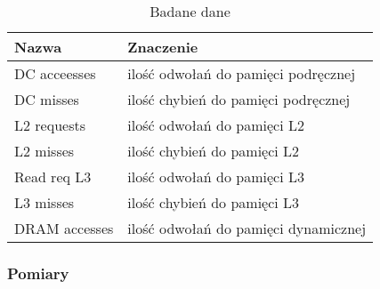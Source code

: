 \begin{table}[H]
\caption{Badane dane}
\begin{tabular}{|l|l|}

\hline
  Nazwa &
  Znaczenie \\
\hline
  DC acceesses &
  ilość odwołań do pamięci podręcznej \\
\hline
  DC misses &
  ilość chybień do pamięci podręcznej \\
\hline
  L2 requests &
  ilość odwołań do pamięci L2 \\
\hline
  L2 misses &
  ilość chybień do pamięci L2 \\
\hline
  Read req L3 &
  ilość odwołań do pamięci L3 \\
\hline
  L3 misses &
  ilość chybień do pamięci L3 \\
\hline
  DRAM accesses &
  ilość odwołań do pamięci dynamicznej \\
\hline

\end{tabular}
\end{table}


\subsubsection{Pomiary}



